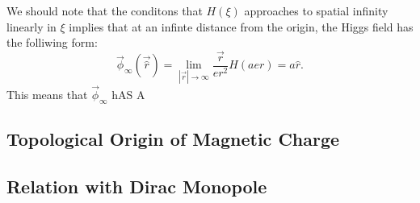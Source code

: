 \documentclass[main.tex]{subfiles}
\begin{document}
 We should note that the conditons that $H(\xi)$ approaches to spatial infinity linearly in $\xi$ implies that at an infinte distance from the origin, the Higgs field has the folliwing form: 
 \begin{equation}
 \vec{\phi}_{\infty}(\vec{\hat{r}}) = \lim_{|\vec{r}| \to \infty } \frac{\vec{r}}{er^2}H(aer) = a \hat{r}.
 \end{equation}
 This means that $\vec{\phi}_{\infty}$ hAS A 


\subsection{Topological Origin of Magnetic Charge}
\subsection{Relation with Dirac Monopole}
\end{document}
